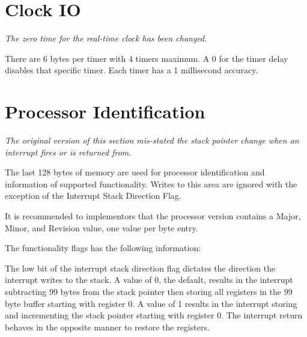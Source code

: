 \documentclass[oneside]{book}
\begin{document}
\setcounter{chapter}{2}

\setcounter{section}{1}

\section{Clock IO}

\textit{The zero time for the real-time clock has been changed.}

There are 6 bytes per timer with 4 timers maximum. A 0 for the timer delay disables that specific timer. Each timer has a 1 millisecond accuracy.







\setcounter{section}{10}
\newpage

\section{Processor Identification}

\textit{The original version of this section mis-stated the stack pointer change
  when an interrupt fires or is returned from.}


The last 128 bytes of memory are used for processor identification and information of supported functionality. Writes to this area are ignored with the exception of the Interrupt Stack Direction Flag.








It is recommended to implementors that the processor version contains a Major, Minor, and Revision value, one value per byte entry.


The functionality flags has the following information:






The low bit of the interrupt stack direction flag dictates the direction the interrupt writes to the stack. A value of 0, the default, results in the interrupt subtracting 99 bytes from the stack pointer then storing all registers in the 99 byte buffer starting with register 0. A value of 1 results in the interrupt storing and incrementing the stack pointer starting with register 0. The interrupt return behaves in the opposite manner to restore the registers.
\end{document}
